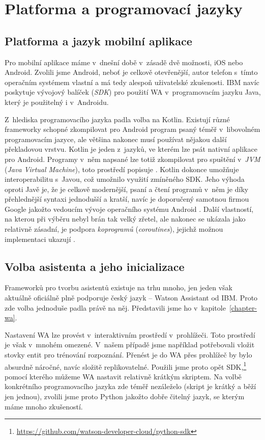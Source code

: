 \section{Platforma a programovací jazyky}\label{analysis}

\subsection{Platforma a jazyk mobilní aplikace}
Pro mobilní aplikace máme v~dnešní době v~zásadě dvě možnosti, iOS nebo Android.
Zvolili jsme Android, neboť je celkově otevřenější, autor telefon s~tímto
operačním systémem vlastní a má tedy alespoň uživatelské zkušenosti. IBM navíc
poskytuje vývojový balíček (\textit{SDK}) pro použití WA v~programovacím
jazyku Java, který je použitelný i v~Androidu.

Z~hlediska programovacího jazyka padla volba na Kotlin. Existují různé frameworky
schopné zkompilovat pro Android program psaný téměř v~libovolném programovacím
jazyce, ale většina nakonec musí používat nějakou další překladovou vrstvu.
Kotlin je jeden z~jazyků, ve kterém lze psát nativní aplikace pro Android. Programy
v~něm napsané lze totiž zkompilovat pro spuštění v~\textit{JVM} (\textit{Java Virtual Machine}),
toto prostředí popisuje \citet{prof_tejinder_singh_hotspot_2014}.
Kotlin dokonce umožňuje interoperabilitu s~Javou, což umožnilo
využití zmíněného SDK. Jeho výhoda oproti Javě je, že je celkově modernější,
psaní a čtení programů v~něm je díky přehlednější syntaxi jednodušší a kratší,
navíc je doporučený samotnou firmou Google jakožto vedoucím vývoje operačního
systému Android \citep{android_blog}.
Další vlastností, na kterou při výběru nebyl brán tak velký
zřetel, ale nakonec se ukázala jako relativně zásadní, je podpora \textit{koprogramů}
(\textit{coroutines}), jejichž možnou implementaci ukazují \citet{theory_practice_coroutines}.

\subsection{Volba asistenta a jeho inicializace}
Frameworků pro tvorbu asistentů existuje na trhu mnoho, jen jeden však aktuálně oficiálně plně
podporuje český jazyk -- Watson Assistant od IBM. Proto zde volba jednoduše
padla právě na něj. Představili jsme ho v~kapitole~\ref{chapter-wa}.

Nastavení WA lze provést v~interaktivním prostředí v~prohlížeči. Toto
prostředí je však v~mnohém omezené. V~našem případě jsme například potřebovali
vložit stovky entit pro trénování rozpoznání. Přenést je do WA přes prohlížeč
by bylo absurdně náročné, navíc složitě replikovatelné. Použili jsme proto opět
SDK,\footnote{\url{https://github.com/watson-developer-cloud/python-sdk}} pomocí
kterého můžeme WA nastavit relativně krátkým skriptem. Na volbě
konkrétního programovacího jazyka zde téměř nezáleželo (skript je krátký a běží
jen jednou), zvolili jsme proto Python jakožto dobře čitelný
jazyk, se kterým máme mnoho zkušeností.

